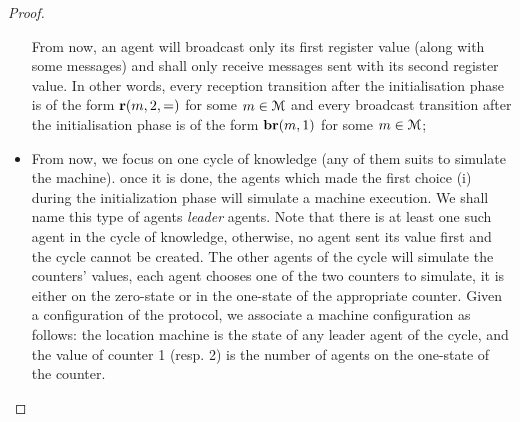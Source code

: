 \begin{proof}
\begin{itemize}
		
		From now, an agent will broadcast only its first register value (along with some messages) and shall only receive messages sent with its second register value. In other words, every reception transition after the initialisation phase is of the form $\textbf{r}(m, 2, =)$ for some $m \in \mathcal{M}$ and every broadcast transition after the initialisation  phase is of the form $\textbf{br}(m, 1)$ for some $m \in \mathcal{M}$;
		
		\item From now, we focus on one cycle of knowledge (any of them suits to simulate the machine). once it is done, the agents which made the first choice (i) during the initialization phase will simulate a machine execution. We shall name this type of agents \emph{leader} agents. Note that there is at least one such agent in the cycle of knowledge, otherwise, no agent sent its value first and the cycle cannot be created. 
		The other agents of the cycle will simulate the counters' values, each agent chooses one of the two counters to simulate, it is either on the zero-state or in the one-state of the appropriate counter. Given a configuration of the protocol, we associate a machine configuration as follows: the location machine is the state of any leader agent of the cycle, and the value of counter 1 (resp. 2) is the number of agents on the one-state of the counter.
		

\end{itemize}
\end{proof}
